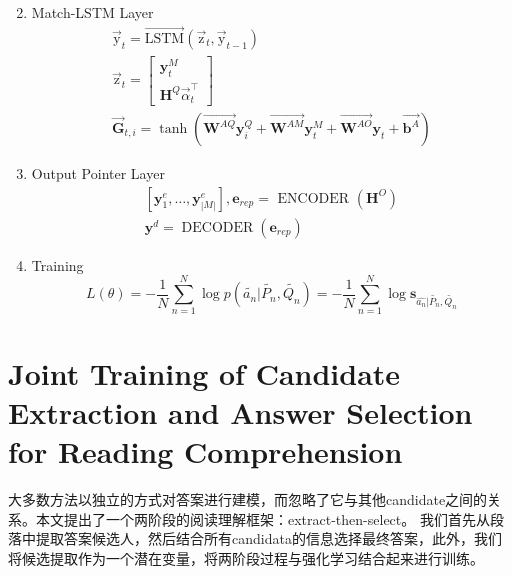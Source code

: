 \documentclass[a4paper,UTF8]{article}
\numberwithin{equation}{section}
\begin{document}
\begin{enumerate}
\begin{equation}
	\end{equation}
	\item Match-LSTM Layer
	\begin{equation}
	\begin{array}{c}{\overrightarrow{\mathrm{y}}_{t}=\overrightarrow{\mathrm{LSTM}}\left(\overrightarrow{\mathrm{z}}_{t}, \overrightarrow{\mathrm{y}}_{t-1}\right)} \\ {\overrightarrow{\mathrm{z}}_{t}=\left[\begin{array}{c}{\mathbf{y}_{t}^{M}} \\ {\mathbf{H}^{Q} \vec{\alpha}_{t}^{\top}}\end{array}\right]}\\\overrightarrow{\mathbf{G}}_{t, i}=\tanh \left(\overrightarrow{\mathbf{W}^{A Q}} \mathbf{y}_{i}^{Q}+\overrightarrow{\mathbf{W}^{A M}} \mathbf{y}_{t}^{M}+\overrightarrow{\mathbf{W}^{A O}} \mathbf{y}_{t}+\overrightarrow{\mathbf{b}^{A}}\right)\end{array}
	\end{equation}
	\item Output Pointer Layer
	\begin{equation}
	\begin{array}{c}{\left[\mathbf{y}_{1}^{e}, \ldots, \mathbf{y}_{|M|}^{e}\right], \mathbf{e}_{r e p}=\text { ENCODER }\left(\mathbf{H}^{O}\right)} \\ {\mathbf{y}^{d}=\operatorname{DECODER}\left(\mathbf{e}_{r e p}\right)}\end{array}
	\end{equation}
	\item Training
	\begin{equation}
		L(\theta)=-\frac{1}{N} \sum_{n=1}^{N} \log p\left(\widetilde{a_{n}} | \widetilde{P_{n}}, \widetilde{Q_{n}}\right)=-\frac{1}{N} \sum_{n=1}^{N} \log \mathbf{s}_{\widehat{a_{n}} | \widetilde{P_{n}}, \widetilde{Q_{n}}}
		\end{equation}
\end{enumerate}



\newpage
\section{Joint Training of Candidate Extraction and Answer Selection for Reading Comprehension}
大多数方法以独立的方式对答案进行建模，而忽略了它与其他candidate之间的关系。本文提出了一个两阶段的阅读理解框架：extract-then-select。
我们首先从段落中提取答案候选人，然后结合所有candidata的信息选择最终答案，此外，我们将候选提取作为一个潜在变量，将两阶段过程与强化学习结合起来进行训练。
\end{document}
